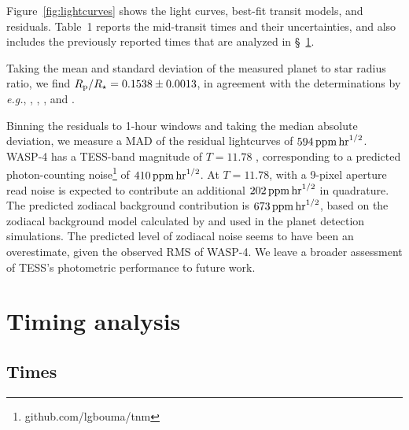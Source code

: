 \documentclass[12pt,twocolumn,tighten]{aastex62}
\begin{document}
Figure~\ref{fig:lightcurves} shows the light curves, best-fit transit
models, and residuals.  Table~1 reports the mid-transit times and
their uncertainties, and also includes the previously reported times
that are analyzed in \S~\ref{sec:timing}.

Taking the mean and standard deviation of the measured planet to star
radius ratio, we find $R_{\rm p}/R_\star=0.1538\pm0.0013$, in
agreement with the determinations by {\it e.g.},
\citet{wilson_wasp-4b_2008}, \citet{gillon_improved_2009},
\citet{winn_transit_2009}, and \citet{southworth_high-precision_2009}.

Binning the residuals to 1-hour windows and taking the median absolute
deviation, we measure a MAD of the residual lightcurves of $594\,{\rm
ppm}\,{\rm hr}^{1/2}$.  WASP-4 has a TESS-band magnitude of $T=11.78$
\citep{stassun_TIC_2018}, corresponding to a predicted photon-counting
noise\footnote{github.com/lgbouma/tnm} of $410\,{\rm ppm}\,{\rm
hr}^{1/2}$.  At $T=11.78$, with a 9-pixel aperture read noise is
expected to contribute an additional $202\,{\rm ppm}\,{\rm hr}^{1/2}$
in quadrature.  The predicted zodiacal background contribution is
$673\,{\rm ppm}\,{\rm hr}^{1/2}$, based on the zodiacal background
model calculated by \citet{winn_photonflux_2013} and used in the
\citet{Sullivan_2015} planet detection simulations.  The predicted
level of zodiacal noise seems to have been an overestimate, given the
observed RMS of WASP-4.  We leave a broader assessment of TESS's
photometric performance to future work.

\section{Timing analysis}
\label{sec:timing}

\subsection{Times}
\label{subsec:times}
\end{document}

